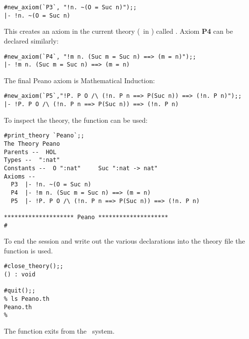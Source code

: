 \begin{session}\begin{verbatim}
#new_axiom(`P3`, "!n. ~(O = Suc n)");;
|- !n. ~(O = Suc n)
\end{verbatim}\end{session}

\noindent This creates an axiom in the current theory (\ie\ in ) called
. Axiom {\small\bf P4} can be declared similarly:


\begin{session}\begin{verbatim}
#new_axiom(`P4`, "!m n. (Suc m = Suc n) ==> (m = n)");;
|- !m n. (Suc m = Suc n) ==> (m = n)
\end{verbatim}\end{session}

The final Peano axiom is Mathematical Induction:

\begin{session}\begin{verbatim}
#new_axiom(`P5`,"!P. P O /\ (!n. P n ==> P(Suc n)) ==> (!n. P n)");;
|- !P. P O /\ (!n. P n ==> P(Suc n)) ==> (!n. P n)
\end{verbatim}\end{session}

To inspect the theory, the function  can be used:

\begin{session}\begin{verbatim}
#print_theory `Peano`;;
The Theory Peano
Parents --  HOL
Types --  ":nat"
Constants --  O ":nat"     Suc ":nat -> nat"
Axioms --
  P3  |- !n. ~(O = Suc n)
  P4  |- !m n. (Suc m = Suc n) ==> (m = n)
  P5  |- !P. P O /\ (!n. P n ==> P(Suc n)) ==> (!n. P n)

******************** Peano ********************
#\end{verbatim}\end{session}

To end the session and write out the various declarations into the theory file
 the function  is used.

\begin{session}\begin{verbatim}
#close_theory();;
() : void

#quit();;
% ls Peano.th
Peano.th
%
\end{verbatim}\end{session}

\noindent The function  exits from the \HOL\ system.

